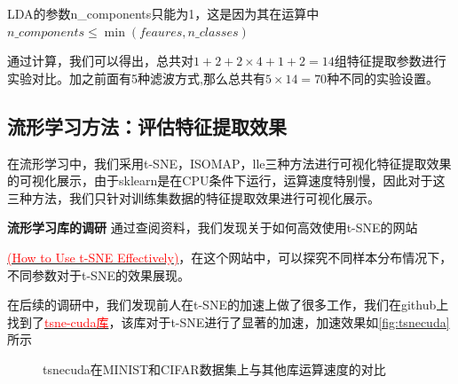 \documentclass[12pt,hyperref,a4paper,UTF8]{ctexart}
\begin{document}
\par
LDA的参数n\_components只能为1，这是因为其在运算中$n\_components \le \min (feaures, n\_classes)$
\par
通过计算，我们可以得出，总共对$1+2+2\times 4 +1+2=14$组特征提取参数进行实验对比。加之前面有5种滤波方式,那么总共有$5\times 14=70$种不同的实验设置。


\subsection{流形学习方法：评估特征提取效果}
在流形学习中，我们采用t-SNE，ISOMAP，lle三种方法进行可视化特征提取效果的可视化展示，由于sklearn是在CPU条件下运行，运算速度特别慢，因此对于这三种方法，我们只针对训练集数据的特征提取效果进行可视化展示。
\par
\textbf{流形学习库的调研}
通过查阅资料，我们发现关于如何高效使用t-SNE的网站{\href{https://distill.pub/2016/misread-tsne}{\textcolor{red}{(How to Use t-SNE Effectively)}}，在这个网站中，可以探究不同样本分布情况下，不同参数对于t-SNE的效果展现。
\par
在后续的调研中，我们发现前人在t-SNE的加速上做了很多工作，我们在github上找到了\href{https://github.com/CannyLab/tsne-cuda}{\textcolor{red}{tsne-cuda库}}，该库对于t-SNE进行了显著的加速，加速效果如\autoref{fig:tsnecuda}所示
\begin{figure}[htbp]
	\centering
	\caption{tsnecuda在MINIST和CIFAR数据集上与其他库运算速度的对比}
	\label{fig:tsnecuda}
\end{figure}

}
\end{document}
